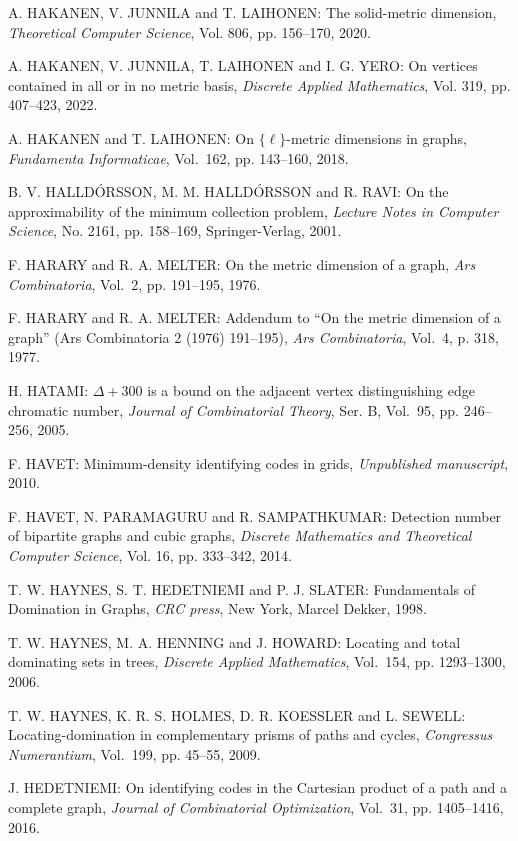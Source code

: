 \begin{thebibliography}{999}
A. HAKANEN, V. JUNNILA and T. LAIHONEN: The solid-metric dimension, {\it Theoretical Computer Science}, Vol. 806, pp. 156--170, 2020.

A. HAKANEN, V. JUNNILA, T. LAIHONEN and I. G. YERO: On vertices contained in all or in no metric basis, {\it Discrete Applied Mathematics}, Vol. 319, pp. 407--423, 2022.

A. HAKANEN and T. LAIHONEN: On $\{\ell\}$-metric dimensions in graphs, {\it Fundamenta Informaticae}, Vol.~162, pp. 143--160, 2018.

B. V. HALLD\'ORSSON, M. M. HALLD\'ORSSON and R. RAVI: On the approximability of the minimum collection problem, {\it Lecture Notes in Computer Science}, No. 2161, pp. 158--169, Springer-Verlag, 2001.

F. HARARY and R. A. MELTER: On the metric dimension of a graph, {\it Ars Combinatoria}, Vol.~2, pp. 191--195, 1976.

F. HARARY and R. A. MELTER: Addendum to ``On the metric dimension of a graph'' (Ars Combinatoria 2 (1976) 191--195), {\it Ars Combinatoria}, Vol.~4, p. 318, 1977.

H. HATAMI: $\Delta +300$ is a bound on the adjacent vertex distinguishing edge chromatic number, {\it Journal of Combinatorial Theory}, Ser. B, Vol.~95, pp. 246--256, 2005.

F. HAVET: Minimum-density identifying codes in grids, {\it Unpublished manuscript}, 2010.

F. HAVET, N. PARAMAGURU and R. SAMPATHKUMAR: Detection number of bipartite graphs and cubic graphs, {\it Discrete Mathematics and Theoretical Computer Science}, Vol. 16, pp. 333--342, 2014.

T. W. HAYNES, S. T. HEDETNIEMI and P. J. SLATER: Fundamentals of Domination in Graphs, {\it CRC press}, New York, Marcel Dekker, 1998.

T. W. HAYNES, M. A. HENNING and J. HOWARD: Locating and total dominating sets in trees, {\it Discrete Applied Mathematics}, Vol.~154, pp. 1293--1300, 2006.

T. W. HAYNES, K. R. S. HOLMES, D. R. KOESSLER and L. SEWELL: Locating-domination in complementary prisms of paths and cycles, {\it Congressus Numerantium}, Vol.~199, pp. 45--55, 2009.

J. HEDETNIEMI: On identifying codes in the Cartesian product of a path and a complete graph, {\it Journal of Combinatorial Optimization}, Vol.~31, pp. 1405--1416, 2016.


\end{thebibliography}
